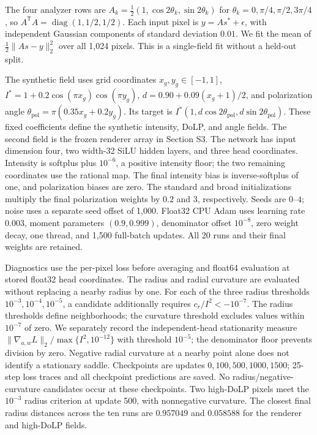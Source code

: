 \documentclass[10pt,a4paper]{article}
\begin{document}
The four analyzer rows are $A_k=\tfrac12(1,\cos2\theta_k,\sin2\theta_k)$ for $\theta_k=0,\pi/4,\pi/2,3\pi/4$, so $A^{\mathsf T}A=\operatorname{diag}(1,1/2,1/2)$. Each input pixel is $y=As^*+\epsilon$, with independent Gaussian components of standard deviation $0.01$. We fit the mean of $\tfrac12\|As-y\|_2^2$ over all 1,024 pixels. This is a single-field fit without a held-out split.

The synthetic field uses grid coordinates $x_g,y_g\in[-1,1]$, $I^*=1+0.2\cos(\pi x_g)\cos(\pi y_g)$, $d=0.90+0.09(x_g+1)/2$, and polarization angle $\theta_{\mathrm{pol}}=\pi(0.35x_g+0.2y_g)$. Its target is $I^*(1,d\cos2\theta_{\mathrm{pol}},d\sin2\theta_{\mathrm{pol}})$. These fixed coefficients define the synthetic intensity, DoLP, and angle fields. The second field is the frozen renderer array in Section S3. The network has input dimension four, two width-32 SiLU hidden layers, and three head coordinates. Intensity is softplus plus $10^{-6}$, a positive intensity floor; the two remaining coordinates use the rational map. The final intensity bias is inverse-softplus of one, and polarization biases are zero. The standard and broad initializations multiply the final polarization weights by $0.2$ and $3$, respectively. Seeds are $0$--$4$; noise uses a separate seed offset of 1,000. Float32 CPU Adam uses learning rate $0.003$, moment parameters $(0.9,0.999)$, denominator offset $10^{-8}$, zero weight decay, one thread, and 1,500 full-batch updates. All 20 runs and their final weights are retained.

Diagnostics use the per-pixel loss before averaging and float64 evaluation at stored float32 head coordinates. The radius and radial curvature are evaluated without replacing a nearby radius by one. For each of the three radius thresholds $10^{-3},10^{-4},10^{-5}$, a candidate additionally requires $c_r/I^2<-10^{-7}$. The radius thresholds define neighborhoods; the curvature threshold excludes values within $10^{-7}$ of zero. We separately record the independent-head stationarity measure $\|\nabla_{a,w}L\|_2/\max\{I^2,10^{-12}\}$ with threshold $10^{-5}$; the denominator floor prevents division by zero. Negative radial curvature at a nearby point alone does not identify a stationary saddle. Checkpoints are updates $0,100,500,1000,1500$; 25-step loss traces and all checkpoint predictions are saved. No radius/negative-curvature candidates occur at these checkpoints. Two high-DoLP pixels meet the $10^{-3}$ radius criterion at update 500, with nonnegative curvature. The closest final radius distances across the ten runs are $0.957049$ and $0.058588$ for the renderer and high-DoLP fields.
\end{document}
